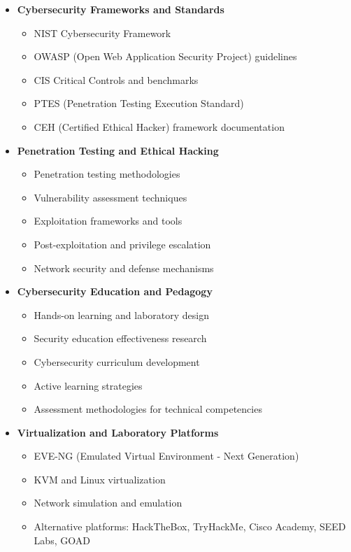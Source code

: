 \begin{itemize}

\item \textbf{Cybersecurity Frameworks and Standards}
\begin{itemize}
\item NIST Cybersecurity Framework
\item OWASP (Open Web Application Security Project) guidelines
\item CIS Critical Controls and benchmarks
\item PTES (Penetration Testing Execution Standard)
\item CEH (Certified Ethical Hacker) framework documentation
\end{itemize}

\item \textbf{Penetration Testing and Ethical Hacking}
\begin{itemize}
\item Penetration testing methodologies
\item Vulnerability assessment techniques
\item Exploitation frameworks and tools
\item Post-exploitation and privilege escalation
\item Network security and defense mechanisms
\end{itemize}

\item \textbf{Cybersecurity Education and Pedagogy}
\begin{itemize}
\item Hands-on learning and laboratory design
\item Security education effectiveness research
\item Cybersecurity curriculum development
\item Active learning strategies
\item Assessment methodologies for technical competencies
\end{itemize}

\item \textbf{Virtualization and Laboratory Platforms}
\begin{itemize}
\item EVE-NG (Emulated Virtual Environment - Next Generation)
\item KVM and Linux virtualization
\item Network simulation and emulation
\item Alternative platforms: HackTheBox, TryHackMe, Cisco Academy, SEED Labs, GOAD
\end{itemize}


\end{itemize}
